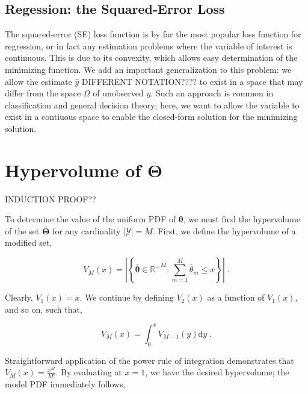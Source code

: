 \documentclass[12pt]{article}
\begin{document}
\subsection{Regession: the Squared-Error Loss}

The squared-error (SE) loss function is by far the most popular loss function for regression, or in fact any estimation problems where the variable of interest is continuous. This is due to its convexity, which allows easy determination of the minimizing function. We add an important generalization to this problem: we allow the estimate $\hat{y}$ DIFFERENT NOTATION???? to exist in a space that may differ from the space $\Omega$ of unobserved $y$. Such an approach is common in classification and general decision theory; here, we want to allow the variable to exist in a contiuous space to enable the closed-form solution for the minimizing solution.









\appendix


\section{Hypervolume of $\bar{\bm{\Theta}}$} \label{app:Theta}

INDUCTION PROOF??

To determine the value of the uniform PDF of $\bm{\theta}$, we must find the hypervolume of the set $\bar{\bm{\Theta}}$ for any cardinality $|\mathcal{Y}| = M$. First, we define the hypervolume of a modified set,

\begin{equation}
V_M(x) = \left| \left\{ \bar{\bm{\theta}} \in {\mathbb{R}^+}^{M}: \sum_{m=1}^{M} \bar{\theta}_m \leq x \right\} \right| \;.
\end{equation}

Clearly, $V_1(x) = x$. We continue by defining $V_2(x)$ as a function of $V_1(x)$, and so on, such that,

\begin{equation}
V_M(x) = \int_0^x V_{M-1}(y) \mathrm{d}y \;.
\end{equation}

Straightforward application of the power rule of integration demonstrates that $V_M(x) = \frac{x^M}{M!}$. By evaluating at $x=1$, we have the desired hypervolume; the model PDF immediately follows,
\end{document}

